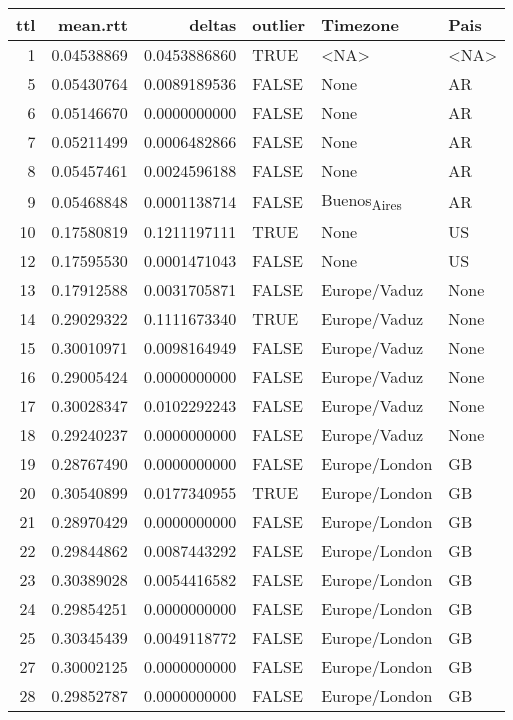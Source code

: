 \documentclass[11pt]{article}
\author{nsm}
\date{\today}
\title{}
\begin{document}
\tableofcontents

\begin{center}
\begin{tabular}{rrrlll}
ttl & mean.rtt & deltas & outlier & Timezone & Pais\\
\hline
1 & 0.04538869 & 0.0453886860 & TRUE & <NA> & <NA>\\
5 & 0.05430764 & 0.0089189536 & FALSE & None & AR\\
6 & 0.05146670 & 0.0000000000 & FALSE & None & AR\\
7 & 0.05211499 & 0.0006482866 & FALSE & None & AR\\
8 & 0.05457461 & 0.0024596188 & FALSE & None & AR\\
9 & 0.05468848 & 0.0001138714 & FALSE & Buenos\textsubscript{Aires} & AR\\
10 & 0.17580819 & 0.1211197111 & TRUE & None & US\\
12 & 0.17595530 & 0.0001471043 & FALSE & None & US\\
13 & 0.17912588 & 0.0031705871 & FALSE & Europe/Vaduz & None\\
14 & 0.29029322 & 0.1111673340 & TRUE & Europe/Vaduz & None\\
15 & 0.30010971 & 0.0098164949 & FALSE & Europe/Vaduz & None\\
16 & 0.29005424 & 0.0000000000 & FALSE & Europe/Vaduz & None\\
17 & 0.30028347 & 0.0102292243 & FALSE & Europe/Vaduz & None\\
18 & 0.29240237 & 0.0000000000 & FALSE & Europe/Vaduz & None\\
19 & 0.28767490 & 0.0000000000 & FALSE & Europe/London & GB\\
20 & 0.30540899 & 0.0177340955 & TRUE & Europe/London & GB\\
21 & 0.28970429 & 0.0000000000 & FALSE & Europe/London & GB\\
22 & 0.29844862 & 0.0087443292 & FALSE & Europe/London & GB\\
23 & 0.30389028 & 0.0054416582 & FALSE & Europe/London & GB\\
24 & 0.29854251 & 0.0000000000 & FALSE & Europe/London & GB\\
25 & 0.30345439 & 0.0049118772 & FALSE & Europe/London & GB\\
27 & 0.30002125 & 0.0000000000 & FALSE & Europe/London & GB\\
28 & 0.29852787 & 0.0000000000 & FALSE & Europe/London & GB\\
\end{tabular}
\end{center}
\end{document}
